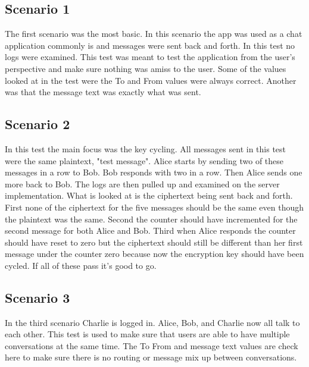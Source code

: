\subsection{Scenario 1}


The first scenario was the most basic. In this scenario the app was used as a chat application commonly is and messages were sent back and forth. In this test no logs were examined. This test was meant to test the application from the user's perspective and make sure nothing was amiss to the user. Some of the values looked at in the test were the To and From values were always correct. Another was that the message text was exactly what was sent.


\subsection{Scenario 2}


In this test the main focus was the key cycling. All messages sent in this test were the same plaintext, "test message". Alice starts by sending two of these messages in a row to Bob. Bob responds with two in a row. Then Alice sends one more back to Bob. The logs are then pulled up and examined on the server implementation. What is looked at is the ciphertext being sent back and forth. First none of the ciphertext for the five messages should be the same even though the plaintext was the same. Second the counter should have incremented for the second message for both Alice and Bob. Third when Alice responds the counter should have reset to zero but the ciphertext should still be different than her first message under the counter zero because now the encryption key should have been cycled. If all of these pass it's good to go.


\subsection{Scenario 3}


In the third scenario Charlie is logged in. Alice, Bob, and Charlie now all talk to each other. This test is used to make sure that users are able to have multiple conversations at the same time. The To From and message text values are check here to make sure there is no routing or message mix up between conversations.



